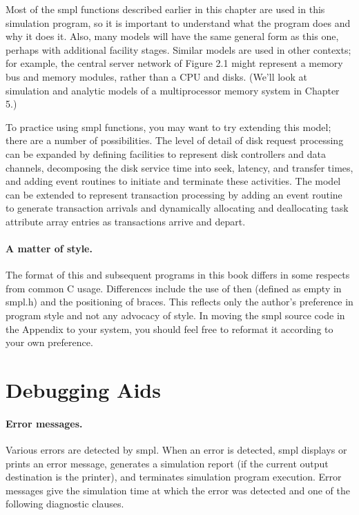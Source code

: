 Most of the smpl functions described earlier in this chapter are used in this
simulation program, so it is important to understand what the program does
and why it does it. Also, many models will have the same general form as this
one, perhaps with additional facility stages. Similar models are used in other
contexts; for example, the central server network of Figure 2.1 might
represent a memory bus and memory modules, rather than a CPU and disks.
(We'll look at simulation and analytic models of a multiprocessor memory
system in Chapter 5.)

To practice using smpl functions, you may want to try extending this model;
there are a number of possibilities. The level of detail of disk request
processing can be expanded by defining facilities to represent disk
controllers and data channels, decomposing the disk service time into seek,
latency, and transfer times, and adding event routines to initiate and
terminate these activities. The model can be extended to represent
transaction processing by adding an event routine to generate transaction
arrivals and dynamically allocating and deallocating task attribute array
entries as transactions arrive and depart.

\paragraph{A matter of style.}
The format of this and subsequent programs in this book differs in some
respects from common C usage. Differences include the use of then (defined as
empty in smpl.h) and the positioning of braces. This reflects only the
author's preference in program style and not any advocacy of style. In moving
the smpl source code in the Appendix to your system, you should feel free to
reformat it according to your own preference.

\section{Debugging Aids}
\label{sec:smpl-debugging-aids}

\paragraph{Error messages.}
Various errors are detected by smpl. When an error is detected, smpl displays
or prints an error message, generates a simulation report (if the current
output destination is the printer), and terminates simulation program
execution. Error messages give the simulation time at which the error was
detected and one of the following diagnostic clauses.

